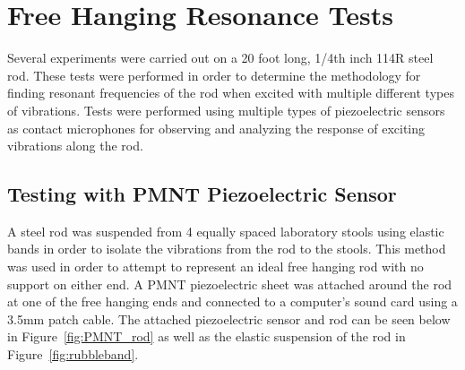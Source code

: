 
\section{Free Hanging Resonance Tests}

Several experiments were carried out on a 20 foot long, 1/4th inch 114R steel rod. These tests were performed in order to determine the methodology for finding resonant frequencies of the rod when excited with multiple different types of vibrations. Tests were performed using multiple types of piezoelectric sensors as contact microphones for observing and analyzing the response of exciting vibrations along the rod. 

\subsection{Testing with PMNT Piezoelectric Sensor}

A steel rod was suspended from 4 equally spaced laboratory stools using elastic bands in order to isolate the vibrations from the rod to the stools. This method was used in order to attempt to represent an ideal free hanging rod with no support on either end. A PMNT piezoelectric sheet was attached around the rod at one of the free hanging ends and connected to a computer’s sound card using a 3.5mm patch cable. The attached piezoelectric sensor and rod can be seen below in Figure~\ref{fig:PMNT_rod} as well as the elastic suspension of the rod in Figure~\ref{fig:rubbleband}.

